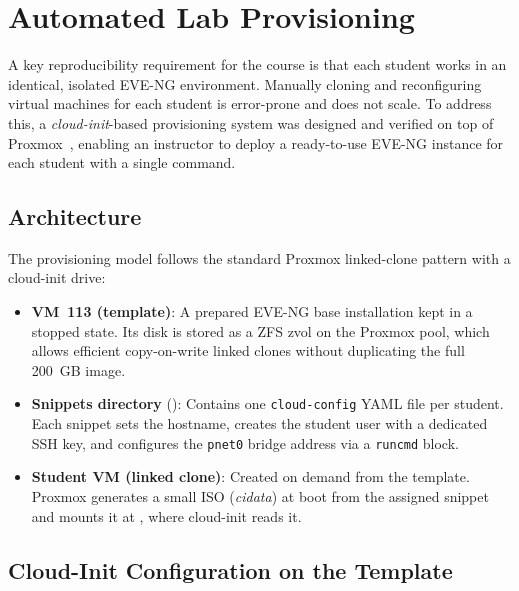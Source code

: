 
\section{Automated Lab Provisioning}
\label{sec:cloud-init}

A key reproducibility requirement for the course is that each student works in an
identical, isolated EVE-NG environment. Manually cloning and reconfiguring virtual
machines for each student is error-prone and does not scale. To address this,
a \textit{cloud-init}-based provisioning system was designed and verified on top
of Proxmox~\cite{proxmox}, enabling an instructor to deploy a ready-to-use
EVE-NG instance for each student with a single command.

\subsection{Architecture}

The provisioning model follows the standard Proxmox linked-clone pattern with
a cloud-init drive:

\begin{itemize}
    \item \textbf{VM~113 (template)}: A prepared EVE-NG base installation kept in
          a stopped state. Its disk is stored as a ZFS zvol on the Proxmox pool,
          which allows efficient copy-on-write linked clones without duplicating the
          full 200~GB image.
    \item \textbf{Snippets directory} (): Contains one
          \texttt{cloud-config} YAML file per student. Each snippet sets the
          hostname, creates the student user with a dedicated SSH key, and configures
          the \texttt{pnet0} bridge address via a \texttt{runcmd} block.
    \item \textbf{Student VM (linked clone)}: Created on demand from the template.
          Proxmox generates a small ISO (\textit{cidata}) at boot from the assigned
          snippet and mounts it at , where cloud-init reads it.
\end{itemize}

\subsection{Cloud-Init Configuration on the Template}

